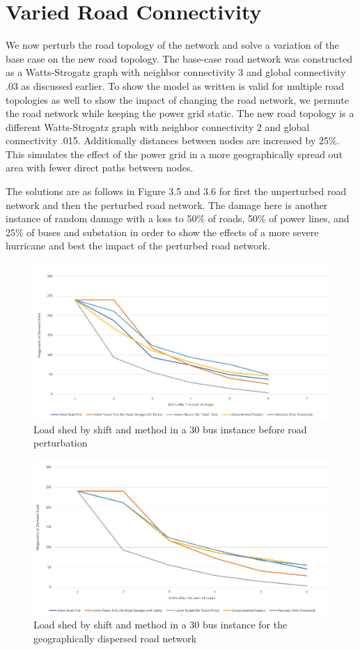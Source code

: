 \section{Varied Road Connectivity}
We now perturb the road topology of the network and solve a variation of the base case on the new road topology. The base-case road network was constructed as a Watts-Strogatz graph with neighbor connectivity 3 and global connectivity .03 as discussed earlier. To show the model as written is valid for multiple road topologies as well to show the impact of changing the road network, we permute the road network while keeping the power grid static. The new road topology is a different Watts-Strogatz graph with neighbor connectivity 2 and global connectivity .015. Additionally distances between nodes are increased by 25\%. This simulates the effect of the power grid in a more geographically spread out area with fewer direct paths between nodes.

The solutions are as follows in Figure 3.5 and 3.6 for first the unperturbed road network and then the perturbed road network. The damage here is another instance of random damage with a loss to 50\% of roads, 50\% of power lines, and 25\% of buses and substation in order to show the effects of a more severe hurricane and best the impact of the perturbed road network. 

\begin{figure}[htbp]
	\centering
	\includegraphics[width=.9\linewidth]{Rplot30unperturbed.png}
	\caption{Load shed by shift and method in a 30 bus instance before road perturbation}
	\label{fig:sub2}
	
	
\end{figure}
\begin{figure}[htbp]
	\centering
	\includegraphics[width=.9\linewidth]{Rplot30Perturbed.png}
	\caption{Load shed by shift and method in a 30 bus instance for the geographically dispersed road network}
	\label{fig:sub2}
	
	
\end{figure}

